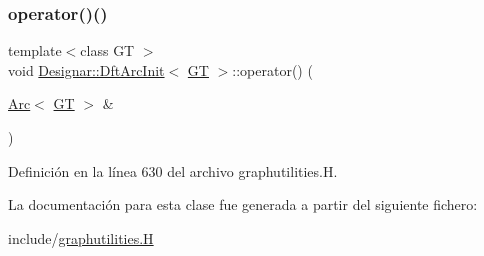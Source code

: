 \subsubsection{\texorpdfstring{operator()()}{operator()()}}
{\footnotesize\ttfamily template$<$class GT $>$ \\
void \hyperlink{class_designar_1_1_dft_arc_init}{Designar\+::\+Dft\+Arc\+Init}$<$ \hyperlink{demo-buildgraph_8_c_a3001c40d2c31ca87ed96cd7d1334a55e}{GT} $>$\+::operator() (\begin{DoxyParamCaption}\item[{\hyperlink{namespace_designar_a3f55fb5513d62ff47cbc8f72b8e95d6f}{Arc}$<$ \hyperlink{demo-buildgraph_8_c_a3001c40d2c31ca87ed96cd7d1334a55e}{GT} $>$ \&}]{ }\end{DoxyParamCaption})\hspace{0.3cm}{\ttfamily [inline]}}



Definición en la línea 630 del archivo graphutilities.\+H.



La documentación para esta clase fue generada a partir del siguiente fichero\+:\begin{DoxyCompactItemize}
\item 
include/\hyperlink{graphutilities_8_h}{graphutilities.\+H}\end{DoxyCompactItemize}
